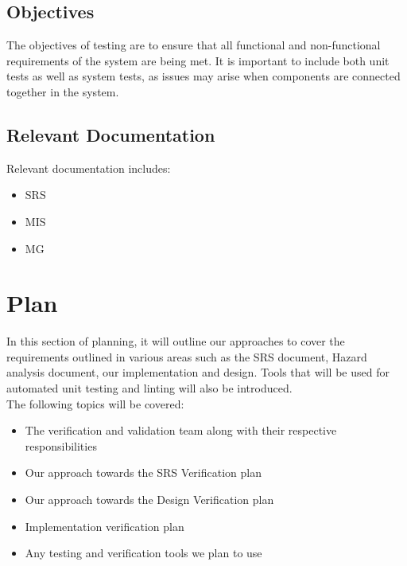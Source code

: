 \documentclass[12pt, titlepage]{article}
\begin{document}
\subsection{Objectives}

The objectives of testing are to ensure that all functional and non-functional requirements of the system are being met. It is important to include both unit tests as well as system tests, as issues may arise when components are connected together in the system. 

\subsection{Relevant Documentation}

Relevant documentation includes:
\begin{itemize}
  \item SRS
  \item MIS
  \item MG
\end{itemize}

\section{Plan}


  In this section of planning, it will outline our approaches to cover the requirements 
  outlined in various areas such as the SRS document, Hazard analysis document, our implementation and design. 
  Tools that will be used for automated unit testing and linting will also be introduced.\\

  The following topics will be covered:

  \begin{itemize}
    \item The verification and validation team along with their respective responsibilities
    \item Our approach towards the SRS Verification plan
    \item Our approach towards the Design Verification plan
    \item Implementation verification plan
    \item Any testing and verification tools we plan to use
  \end{itemize}
\end{document}
